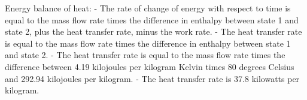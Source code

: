 Energy balance of heat:
- The rate of change of energy with respect to time is equal to the mass flow rate times the difference in enthalpy between state 1 and state 2, plus the heat transfer rate, minus the work rate.
- The heat transfer rate is equal to the mass flow rate times the difference in enthalpy between state 1 and state 2.
- The heat transfer rate is equal to the mass flow rate times the difference between 4.19 kilojoules per kilogram Kelvin times 80 degrees Celsius and 292.94 kilojoules per kilogram.
- The heat transfer rate is 37.8 kilowatts per kilogram.